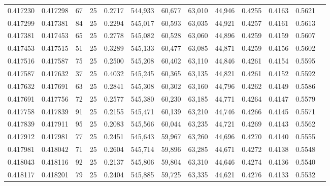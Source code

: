 \begin{tabular}{rrrrrrrrrrrrr}
0.417230 & 0.417298 &    67 &  25 &                                     0.2717 & 544,933 &  60,677 &  63,010 &  44,946 & 0.4255 & 0.4163 & 0.5621 \\
0.417299 & 0.417381 &    84 &  25 &                                     0.2294 & 545,017 &  60,593 &  63,035 &  44,921 & 0.4257 & 0.4161 & 0.5613 \\
0.417381 & 0.417453 &    65 &  25 &                                     0.2778 & 545,082 &  60,528 &  63,060 &  44,896 & 0.4259 & 0.4159 & 0.5607 \\
0.417453 & 0.417515 &    51 &  25 &                                     0.3289 & 545,133 &  60,477 &  63,085 &  44,871 & 0.4259 & 0.4156 & 0.5602 \\
0.417516 & 0.417587 &    75 &  25 &                                     0.2500 & 545,208 &  60,402 &  63,110 &  44,846 & 0.4261 & 0.4154 & 0.5595 \\
0.417587 & 0.417632 &    37 &  25 &                                     0.4032 & 545,245 &  60,365 &  63,135 &  44,821 & 0.4261 & 0.4152 & 0.5592 \\
0.417632 & 0.417691 &    63 &  25 &                                     0.2841 & 545,308 &  60,302 &  63,160 &  44,796 & 0.4262 & 0.4149 & 0.5586 \\
0.417691 & 0.417756 &    72 &  25 &                                     0.2577 & 545,380 &  60,230 &  63,185 &  44,771 & 0.4264 & 0.4147 & 0.5579 \\
0.417758 & 0.417839 &    91 &  25 &                                     0.2155 & 545,471 &  60,139 &  63,210 &  44,746 & 0.4266 & 0.4145 & 0.5571 \\
0.417839 & 0.417911 &    95 &  25 &                                     0.2083 & 545,566 &  60,044 &  63,235 &  44,721 & 0.4269 & 0.4143 & 0.5562 \\
0.417912 & 0.417981 &    77 &  25 &                                     0.2451 & 545,643 &  59,967 &  63,260 &  44,696 & 0.4270 & 0.4140 & 0.5555 \\
0.417981 & 0.418042 &    71 &  25 &                                     0.2604 & 545,714 &  59,896 &  63,285 &  44,671 & 0.4272 & 0.4138 & 0.5548 \\
0.418043 & 0.418116 &    92 &  25 &                                     0.2137 & 545,806 &  59,804 &  63,310 &  44,646 & 0.4274 & 0.4136 & 0.5540 \\
0.418117 & 0.418201 &    79 &  25 &                                     0.2404 & 545,885 &  59,725 &  63,335 &  44,621 & 0.4276 & 0.4133 & 0.5532 \\

\end{tabular}
